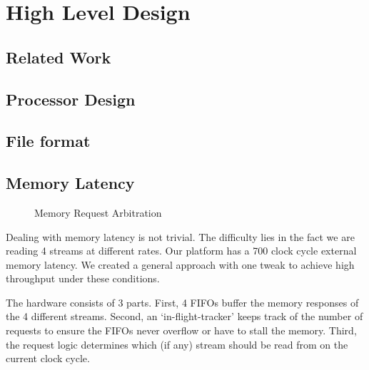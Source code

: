 \chapter{High Level Design}
\label{chp:high_level_design}
\section{Related Work}
\section{Processor Design}
\section{File format}
\section{Memory Latency}
\begin{figure}
\caption{Memory Request Arbitration}
\label{fig:memory_latency}
\end{figure}
Dealing with memory latency is not trivial. The difficulty lies in the fact we are reading 4 streams at different rates. Our platform has a 700 clock cycle external memory latency. We created a general approach with one tweak to achieve high throughput under these conditions.

The hardware consists of 3 parts. First, 4 FIFOs buffer the memory responses of the 4 different streams. Second, an `in-flight-tracker' keeps track of the number of requests to ensure the FIFOs never overflow or have to stall the memory. Third, the request logic determines which (if any) stream should be read from on the current clock cycle.

